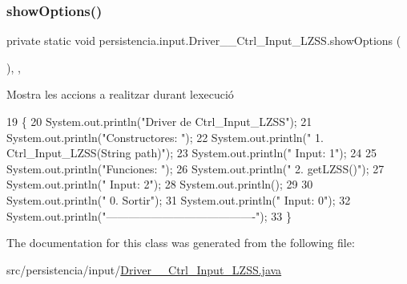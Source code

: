 \subsubsection{\texorpdfstring{show\+Options()}{showOptions()}}
{\footnotesize\ttfamily private static void persistencia.\+input.\+Driver\+\_\+\+\_\+\+Ctrl\+\_\+\+Input\+\_\+\+L\+Z\+S\+S.\+show\+Options (\begin{DoxyParamCaption}{ }\end{DoxyParamCaption})\hspace{0.3cm}{\ttfamily [inline]}, {\ttfamily [static]}, {\ttfamily [private]}}



Mostra les accions a realitzar durant l\textquotesingle{}execució 


\begin{DoxyCode}
19                                      \{
20         System.out.println(\textcolor{stringliteral}{"Driver de Ctrl\_Input\_LZSS"});
21         System.out.println(\textcolor{stringliteral}{"Constructores: "});
22         System.out.println(\textcolor{stringliteral}{"     1. Ctrl\_Input\_LZSS(String path)"});
23         System.out.println(\textcolor{stringliteral}{"     Input: 1"});
24 
25         System.out.println(\textcolor{stringliteral}{"Funciones: "});
26         System.out.println(\textcolor{stringliteral}{"     2. getLZSS()"});
27         System.out.println(\textcolor{stringliteral}{"     Input: 2"});
28         System.out.println();
29 
30         System.out.println(\textcolor{stringliteral}{"     0. Sortir"});
31         System.out.println(\textcolor{stringliteral}{"     Input: 0"});
32         System.out.println(\textcolor{stringliteral}{"----------------------------------------"});
33     \}
\end{DoxyCode}


The documentation for this class was generated from the following file\+:\begin{DoxyCompactItemize}
\item 
src/persistencia/input/\hyperlink{Driver____Ctrl__Input__LZSS_8java}{Driver\+\_\+\+\_\+\+Ctrl\+\_\+\+Input\+\_\+\+L\+Z\+S\+S.\+java}\end{DoxyCompactItemize}
